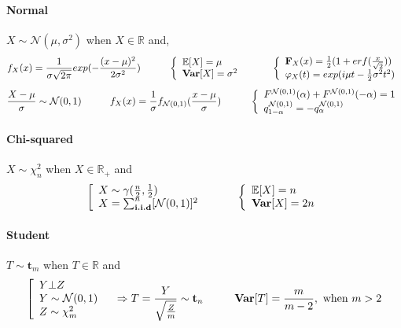 \documentclass[a4paper,10pt]{article}
\begin{document}
\paragraph{Normal} $X \sim \mathcal{N}(\mu,\sigma^2)$ when $X \in \mathbb{R}$ and,
\[
f_{X}(x) = \frac{1}{\sigma \sqrt{2\pi}} exp (-\frac{(x-\mu)^2}{2\sigma^2})
\hspace{10mm}
\left\{
\begin{array}{l}
\mathbb{E}[X]=\mu \\
\textbf{Var}[X]=\sigma^2
\end{array}\right.
\hspace{10mm}
\left\{
\begin{array}{l}
\textbf{F}_X(x) =  \frac{1}{2}(1+erf(\frac{x}{\sqrt{2}})) \\
\varphi_{X}(t) = exp(i\mu t - \frac{1}{2}\sigma^2 t^2)
\end{array}\right.
\]
\[
\frac{X - \mu}{\sigma} \sim \mathcal{N}(0,1)
\hspace{10mm}
f_{X}(x) = \frac{1}{\sigma}f_{\mathcal{N}(0,1)}(\frac{x-\mu}{\sigma})
\hspace{10mm}
\left\{
\begin{array}{l}
F^{\mathcal{N}(0,1)} (\alpha) + F^{\mathcal{N}(0,1)}(-\alpha) = 1 \\
q^{\mathcal{N}(0,1)}_{1-\alpha} = - q^{\mathcal{N}(0,1)}_{\alpha} 
\end{array}\right.
\]

\paragraph{Chi-squared} $X\sim \chi^2_n$ when  $X \in \mathbb{R}_+$ and
\[
\left[
\begin{array}{l}
X \sim \gamma(\frac{n}{2}, \frac{1}{2}) \\
X = \sum^{n}_{\textbf{i.i.d}} [ \mathcal{N}(0,1) ]^2
\end{array}\right.
\hspace{10mm}
\left\{
\begin{array}{l}
\mathbb{E}[X]= n \\
\textbf{Var}[X]=2n
\end{array}\right.
\]


\paragraph{Student} $T\sim \textbf{t}_m$ when  $T \in \mathbb{R}$ and
\[
\left[
\begin{array}{l}
Y \bot Z                \\
Y \sim \mathcal{N}(0,1) \\
Z \sim  \chi^2_m  
\end{array}\right.
\hspace{3mm} \Rightarrow
T=\frac{Y}{\sqrt{\frac{Z}{m}}} \sim \textbf{t}_n
\hspace{10mm}
\textbf{Var}[T]= \frac{m}{m-2} , \text{  when } m>2 
\]
\end{document}
